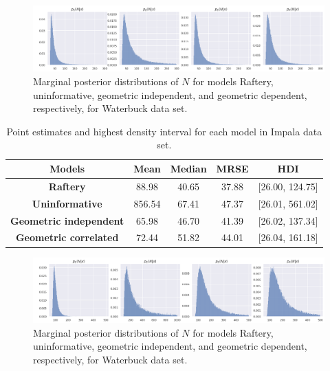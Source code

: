 \begin{figure}[ht]
    \centering
    \includegraphics[width=\textwidth]{../../images/marginal-distributions.png}
    \caption{Marginal posterior distributions of $N$ for models Raftery, uninformative, geometric independent, and geometric dependent, respectively, for Waterbuck data set.}
    \label{fig:marginal-posteriors}
\end{figure}

\begin{table}[!ht]
    \centering
    \begin{tabular}{|c|c|c|c|c|}
        \hline
        {\bf Models} & {\bf Mean} &  {\bf Median} &   {\bf MRSE} &
        {\bf HDI} \\\hline
        {\bf Raftery} &   88.98 &   40.65 &  37.88 &  [26.00, 124.75] \\\hline
        {\bf Uninformative} &  856.54 &   67.41	 &  47.37 &   [26.01, 561.02] \\\hline
        {\bf Geometric independent} &   65.98 &   46.70 &  41.39 &  [26.02, 137.34] \\\hline
        {\bf Geometric correlated} &    72.44 &   51.82 &  44.01 &    [26.04, 161.18] \\\hline
        \end{tabular}
        \caption{Point estimates and highest density interval for each model in Impala data set.}
        \label{tab:summary-statistics-posterior-impala}
\end{table}

\begin{figure}[!ht]
    \centering
    \includegraphics[width=\textwidth]{../../images/marginal-distributions-waterbuck.png}
    \caption{Marginal posterior distributions of $N$ for models Raftery, uninformative, geometric independent, and geometric dependent, respectively, for Waterbuck data set.}
    \label{fig:marginal-posteriors-waterbuck}
\end{figure}


